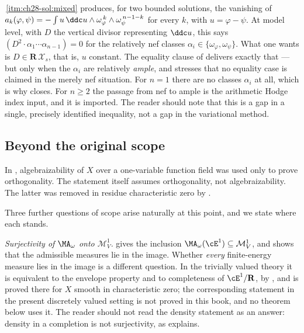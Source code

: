 \begin{remark}
\label{rem:ch28-uniqueness-gap}
\,\cref{itm:ch28-sol:mixed} produces, for two
bounded solutions, the vanishing of
$a_k(\varphi,\psi)=-\int u\,\ddc u\wedge
\omega_\varphi^{\,k}\wedge\omega_\psi^{\,n-1-k}$ for every $k$, with
$u=\varphi-\psi$.  At model level, with $D$ the vertical divisor
representing $\ddc u$, this says
$(D^2\cdot\alpha_1\cdots\alpha_{n-1})=0$ for the relatively nef classes
$\alpha_i\in\{\omega_\varphi,\omega_\psi\}$.  What one wants is
$D\in\mathbf R\,\mathcal X_s$, that is, $u$ constant.  The equality
clause of  delivers exactly that ---
but only when the $\alpha_i$ are relatively \emph{ample}, and
 stresses that no equality case is claimed in the
merely nef situation.  For $n=1$ there are no classes
$\alpha_i$ at all, which is why  closes.
For $n\geq2$ the passage from nef to ample is the arithmetic Hodge index
input, and it is imported.  The reader should note that this is a gap in a
single, precisely identified inequality, not a gap in the variational
method.
\end{remark}

\subsection{Beyond the original scope}
\label{sec:ch28-surjectivity}

In \cite{BFJ15}, algebraizability of $X$ over a one-variable function
field was used only to prove orthogonality.  The statement
 itself assumes orthogonality, not
algebraizability.  The latter was removed in residue characteristic zero by
\cite[Theorem~6.3.3 and Corollary~6.3.4]{BGGJKM20}.

Three further questions of scope arise naturally at this point, and we state
where each stands.

\emph{Surjectivity of $\MA_\omega$ onto $\mathcal M^1_V$.}
 gives the inclusion
$\MA_\omega(\cE^1)\subseteq\mathcal M^1_V$, and
 shows that the admissible measures lie
in the image.  Whether \emph{every} finite-energy measure lies in the image
is a different question.  In the trivially valued theory it is equivalent to
the envelope property and to completeness of $\cE^1/\mathbf R$, by
\cite[Theorem~12.8]{BJ22}, and is proved there for $X$ smooth in
characteristic zero; the corresponding statement in the present discretely
valued setting is not proved in this book, and no theorem below uses it.
The reader should not read the density statement
 as an answer: density in a
completion is not surjectivity, as
 explains.

